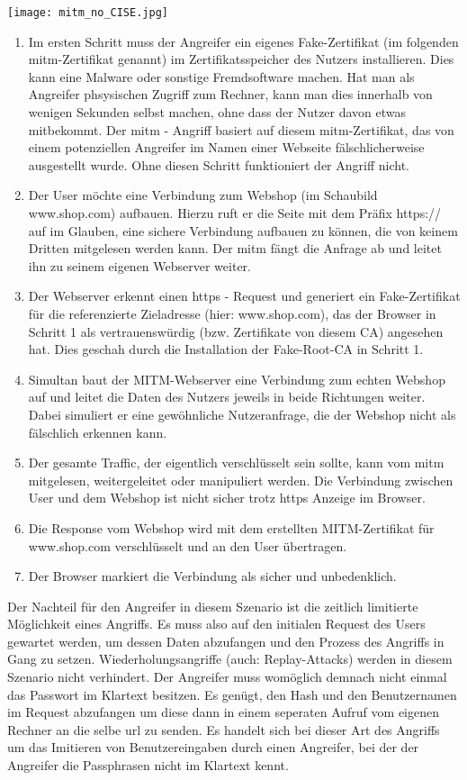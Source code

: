 \texttt{[image: mitm\_no\_CISE.jpg]}

\begin{enumerate} 
\item Im ersten Schritt muss der Angreifer ein eigenes Fake-Zertifikat (im folgenden \ac{mitm}-Zertifikat genannt) im Zertifikatsspeicher des Nutzers installieren. Dies kann eine Malware oder sonstige Fremdsoftware machen. Hat man als Angreifer phsysischen Zugriff zum Rechner, kann man dies innerhalb von wenigen Sekunden selbst machen, ohne dass der Nutzer davon etwas mitbekommt. Der \ac{mitm} - Angriff basiert auf diesem \ac{mitm}-Zertifikat, das von einem potenziellen Angreifer im Namen einer Webseite fälschlicherweise ausgestellt wurde. Ohne diesen Schritt funktioniert der Angriff nicht.
\item Der User möchte eine Verbindung zum Webshop (im Schaubild www.shop.com) aufbauen. Hierzu ruft er die Seite mit dem Präfix https:// auf im Glauben, eine sichere Verbindung aufbauen zu können, die von keinem Dritten mitgelesen werden kann. Der \ac{mitm} fängt die Anfrage ab und leitet ihn zu seinem eigenen Webserver weiter.
\item Der Webserver erkennt einen \ac{https} - Request und generiert ein Fake-Zertifikat für die referenzierte Zieladresse (hier: www.shop.com), das der Browser in Schritt 1 als vertrauenswürdig (bzw. Zertifikate von diesem CA) angesehen hat. Dies geschah durch die Installation der Fake-Root-CA in Schritt 1.
\item Simultan baut der MITM-Webserver eine Verbindung zum echten Webshop auf und leitet die Daten des Nutzers jeweils in beide Richtungen weiter. Dabei simuliert er eine gewöhnliche Nutzeranfrage, die der Webshop nicht als fälschlich erkennen kann.
\item Der gesamte Traffic, der eigentlich verschlüsselt sein sollte, kann vom \ac{mitm} mitgelesen, weitergeleitet oder manipuliert werden. Die Verbindung zwischen User und dem Webshop ist nicht sicher trotz \ac{https} Anzeige im Browser.
\item Die Response vom Webshop wird mit dem erstellten MITM-Zertifikat für www.shop.com verschlüsselt und an den User übertragen.
\item Der Browser markiert die Verbindung als sicher und unbedenklich.
\end{enumerate}

Der Nachteil für den Angreifer in diesem Szenario ist die zeitlich limitierte Möglichkeit eines Angriffs. Es muss also auf den initialen Request des Users gewartet werden, um dessen Daten abzufangen und den Prozess des Angriffs in Gang zu setzen. Wiederholungsangriffe (auch: Replay-Attacks) werden in diesem Szenario nicht verhindert. Der Angreifer muss womöglich demnach nicht einmal das Passwort im Klartext besitzen. Es genügt, den Hash und den Benutzernamen im Request abzufangen um diese dann in einem seperaten Aufruf vom eigenen Rechner an die selbe \ac{url} zu senden. Es handelt sich bei dieser Art des Angriffs um das Imitieren von Benutzereingaben durch einen Angreifer, bei der der Angreifer die Passphrasen nicht im Klartext kennt.

